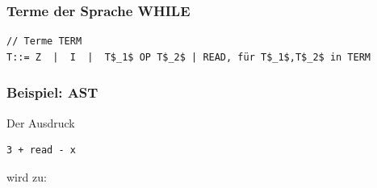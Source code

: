 \subsubsection{Terme der Sprache WHILE}
\begin{lstlisting}[mathescape]
// Terme TERM
T::= Z  |  I  |  T$_1$ OP T$_2$ | READ, für T$_1$,T$_2$ in TERM
\end{lstlisting}

\subsubsection{Beispiel: AST}
Der Ausdruck
\begin{lstlisting}
3 + read - x 
\end{lstlisting}
wird zu:\\

